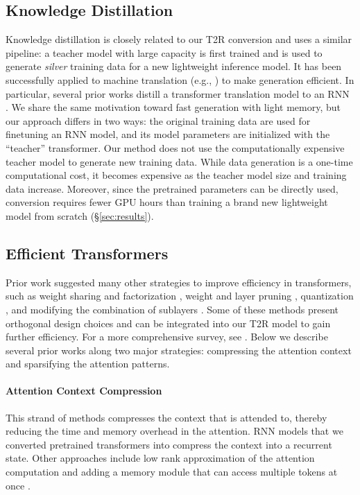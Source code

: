 \documentclass[11pt]{article}
\newcommand{\TRNN}{T2R\xspace}
\begin{document}
\subsection{Knowledge Distillation}
Knowledge distillation \cite{Hinton2015DistillingTK} is closely related to our \TRNN conversion and uses a similar pipeline: a teacher model with large capacity is first trained and is used to generate \textit{silver} training data for a new lightweight inference model. It has been successfully applied to machine translation (e.g., \citealp{Kim2016SequenceLevelKD, Gu2017NonAutoregressiveNM}) to make generation efficient.
In particular, several prior works distill a transformer translation model to an RNN \cite{senellart-etal-2018-opennmt, kim-etal-2019-research}. 
We share the same motivation toward fast generation with light memory, but our approach differs in two ways: the original training data are used for finetuning an RNN model, and its model parameters are initialized with the ``teacher'' transformer.
Our method does not use the computationally expensive teacher model to generate new training data.
While data generation is a one-time computational cost, it becomes expensive as the teacher model size and training data increase.
Moreover, since the pretrained parameters can be directly used, conversion requires fewer GPU hours than training a brand new lightweight model from scratch (\S\ref{sec:results}).

\subsection{Efficient Transformers}
Prior work suggested many other strategies to improve efficiency in transformers, such as weight sharing and factorization \cite{universal, albert}, weight and layer pruning \cite{weightpruning,layerdrop}, quantization \cite{q8bert,quantshen}, and modifying the combination of sublayers \cite{press-etal-2020-sand,modifysublayers}.
Some of these methods present orthogonal design choices and can be integrated into our \TRNN model to gain further efficiency. 
For a more comprehensive survey, see \citet{Tay2020EfficientTA}.
Below we describe several prior works along two major strategies: compressing the attention context and sparsifying the attention patterns.
\paragraph{Attention Context Compression}
This strand of methods compresses the context that is attended to, thereby reducing the time and memory overhead in the attention.
RNN models that we converted pretrained transformers into compress the context into a recurrent state.
Other approaches include low rank approximation of the attention computation \cite{Wang2020LinformerSW, synthesizer} and adding a memory module that can access multiple tokens at once \cite{liuetal2018,dai-etal-2019-transformerxl,pmlr-v97-lee19d,ainslie-etal-2020-etc,raeetal2020,longformer,bigbird}.
\end{document}

